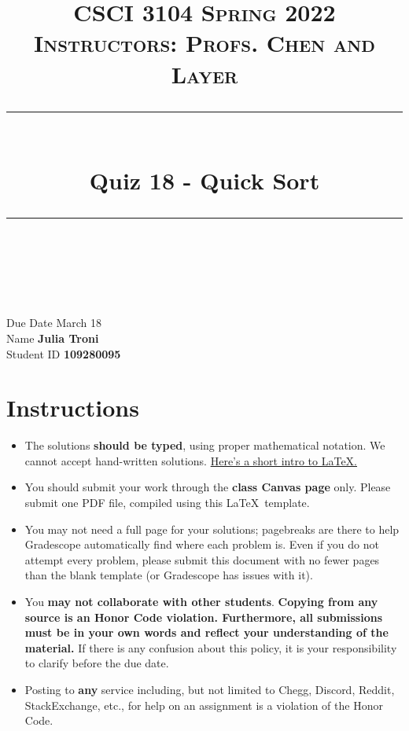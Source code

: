 \documentclass[11pt]{article}
\title{
\normalfont \normalsize 
\textsc{CSCI 3104 Spring 2022 \\ 
Instructors: Profs. Chen and Layer} \\
[10pt] 
\rule{\linewidth}{0.5pt} \\[6pt] 
\huge Quiz 18 - Quick Sort \\
\rule{\linewidth}{2pt}  \\[10pt]
}
\date{}
\theoremstyle{definition}
\theoremstyle{definition}
\theoremstyle{definition}
\begin{document}

\maketitle


\noindent
Due Date \dotfill March 18 \\
Name \dotfill \textbf{Julia Troni} \\
Student ID \dotfill \textbf{109280095} \\



\tableofcontents

\section{Instructions}
 \begin{itemize}
	\item The solutions \textbf{should be typed}, using proper mathematical notation. We cannot accept hand-written solutions. \href{http://ece.uprm.edu/~caceros/latex/introduction.pdf}{Here's a short intro to \LaTeX.}
	\item You should submit your work through the \textbf{class Canvas page} only. Please submit one PDF file, compiled using this \LaTeX \ template.
	\item You may not need a full page for your solutions; pagebreaks are there to help Gradescope automatically find where each problem is. Even if you do not attempt every problem, please submit this document with no fewer pages than the blank template (or Gradescope has issues with it).

	\item You \textbf{may not collaborate with other students}. \textbf{Copying from any source is an Honor Code violation. Furthermore, all submissions must be in your own words and reflect your understanding of the material.} If there is any confusion about this policy, it is your responsibility to clarify before the due date. 

	\item Posting to \textbf{any} service including, but not limited to Chegg, Discord, Reddit, StackExchange, etc., for help on an assignment is a violation of the Honor Code.

\end{itemize}
\end{document}
